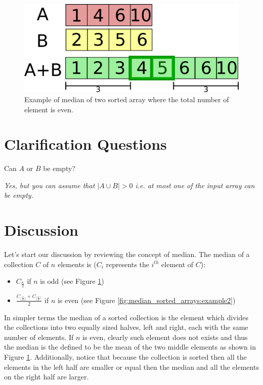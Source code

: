 \begin{figure}
	\label{fig:median_sorted_arrays:example1}
	\centering
	\includegraphics[scale=1.0]{sources/median_sorted_arrays/images/example1}
	\caption[Example of median of two sorted array.]{Example of median of two sorted array where the total number of element is even.}
\end{figure}


\section{Clarification Questions}

\begin{QandA}
	\item Can $A$ or $B$ be empty?
	\begin{answered}
		\textit{Yes, but you can assume that $|A \cup B| > 0$ i.e. at most one of the input array can be empty.}
	\end{answered}
	
\end{QandA}

\section{Discussion}
\label{median_sorted_arrays:sec:discussion}
Let's start our discussion by reviewing the concept of median. The median of a collection $C$ of $n$
elements is ($C_i$ represents the $i^{th}$ element of $C$):
\begin{itemize}
	\item $C_{\frac{n}{2}}$ if $n$ is odd (see Figure \ref{fig:median_sorted_arrays:example1})
	\item $\frac{C_{ \lfloor \frac{n}{2} \rfloor    }+C_{ \lceil \frac{n}{2} \rceil   }}{2}$ if $n$ is even (see Figure
	\ref{fig:median_sorted_arrays:example2})
\end{itemize}
In simpler terms the median of a sorted collection is the element which divides the collections into
two equally sized halves, left and right, each with the same number of elements. 
If $n$ is even, clearly such element does not exists and thus the median is the defined to be the mean of the two middle
elements as shown in Figure \ref{fig:median_sorted_arrays:example1}.
Additionally, notice that because the collection is sorted then all the elements in the left half are smaller or equal then
the median and all the elements on the right half are larger. 

